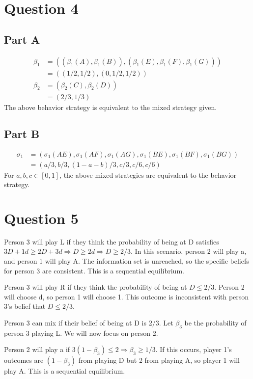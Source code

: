 \documentclass[11pt]{article} %
\begin{document}
\section{Question 4}
\subsection{Part A}
\begin{align*}
\beta_1 &= \left((\beta_1(A),\beta_1(B)),(\beta_1(E),\beta_1(F),\beta_1(G))\right)\\
&= ((1/2,1/2),(0,1/2,1/2))\\
\beta_2 &= (\beta_2(C),\beta_2(D))\\
&= (2/3,1/3)
\end{align*}
The above behavior strategy is equivalent to the mixed strategy given.
\subsection{Part B}
\begin{align*}
\sigma_1 &= \left(\sigma_1(AE),\sigma_1(AF),\sigma_1(AG),\sigma_1(BE),\sigma_1(BF),\sigma_1(BG) \right) \\
&= (a/3,b/3,(1-a-b)/3,c/3,c/6,c/6)
\end{align*}
For $a,b,c \in [0,1]$, the above mixed strategies are equivalent to the behavior strategy.
\section{Question 5}

Person 3 will play L if they think the probability of being at D satisfies $3D + 1d \geq 2D + 3d \Rightarrow D\geq 2d \Rightarrow D \geq 2/3$. In this scenario, person 2 will play a, and person 1 will play A. The information set is unreached, so the specific beliefs for person 3 are consistent. This is a sequential equilibrium.

Person 3 will play R if they think the probability of being at $D\leq 2/3$. Person 2 will choose d, so person 1 will choose 1. This outcome is inconsistent with person 3's belief that $D\leq 2/3$.

Person 3 can mix if their belief of being at D is $2/3$. Let $\beta_3$ be the probability of person 3 playing L. We will now focus on person 2.

Person 2 will play a if $3(1-\beta_3)\leq 2 \Rightarrow \beta_3\geq 1/3.$ If this occurs, player 1's outcomes are $(1-\beta_3)$ from playing D but 2 from playing A, so player 1 will play A. This is a sequential equilibrium.
\end{document}
